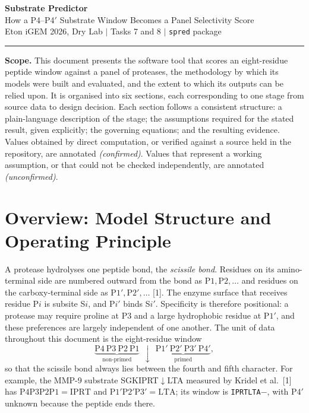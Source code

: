 \documentclass[10pt,a4paper]{article}
\numberwithin{equation}{section}
\newcommand{\cit}[1]{[#1]}
\newcommand{\FLAG}{\textit{(unconfirmed)}}
\newcommand{\CONF}{\textit{(confirmed)}}
\newcommand{\pos}[1]{\mathrm{P}#1}
\newcommand{\prm}[1]{\mathrm{P}#1'}
\begin{document}
\begin{center}
{\LARGE\bfseries Substrate Predictor}\\[0.4em]
{\large How a P4--P4$'$ Substrate Window Becomes a Panel Selectivity Score}\\[0.25em]
{\small\color{gray}
Eton iGEM 2026, Dry Lab \quad$|$\quad
Tasks 7 and 8 \quad$|$\quad
\texttt{spred} package}
\end{center}
\vspace{0.4em}\hrule\vspace{0.7em}

\noindent\textbf{Scope.}
This document presents the software tool that scores an eight-residue
peptide window against a panel of proteases, the methodology by which its
models were built and evaluated, and the extent to which its outputs can be
relied upon. It is organised into six sections, each corresponding to one
stage from source data to design decision. Each section follows a
consistent structure: a plain-language description of the stage; the
assumptions required for the stated result, given explicitly; the governing
equations; and the resulting evidence. Values obtained by direct computation, or verified
against a source held in the repository, are annotated \CONF. Values that
represent a working assumption, or that could not be checked
independently, are annotated \FLAG.

\section{Overview: Model Structure and Operating Principle}
\label{sec:story}

A protease hydrolyses one peptide bond, the \emph{scissile bond}. Residues
on its amino-terminal side are numbered outward from the bond as
$\pos{1},\pos{2},\dots$ and residues on the carboxy-terminal side as
$\prm{1},\prm{2},\dots$ \cit{1}. The enzyme surface that receives residue
$\pos{i}$ is subsite S$i$, and $\prm{i}$ binds S$i'$. Specificity is
therefore positional: a protease may require proline at $\pos{3}$ and a large
hydrophobic residue at $\prm{1}$, and these preferences are largely
independent of one another. The unit of data throughout this document is the
eight-residue window
\[
\underbrace{\pos{4}\ \pos{3}\ \pos{2}\ \pos{1}}_{\text{non-primed}}\ \ \downarrow\ \ \underbrace{\prm{1}\ \prm{2}\ \prm{3}\ \prm{4}}_{\text{primed}},
\]
so that the scissile bond always lies between the fourth and fifth character.
For example, the MMP-9 substrate SGKIPRT$\downarrow$LTA measured by
Kridel et al.\ \cit{1} has $\pos{4}\pos{3}\pos{2}\pos{1}=\mathrm{IPRT}$ and
$\prm{1}\prm{2}\prm{3}=\mathrm{LTA}$; its window is \texttt{IPRTLTA}$-$, with
$\prm{4}$ unknown because the peptide ends there.
\end{document}
